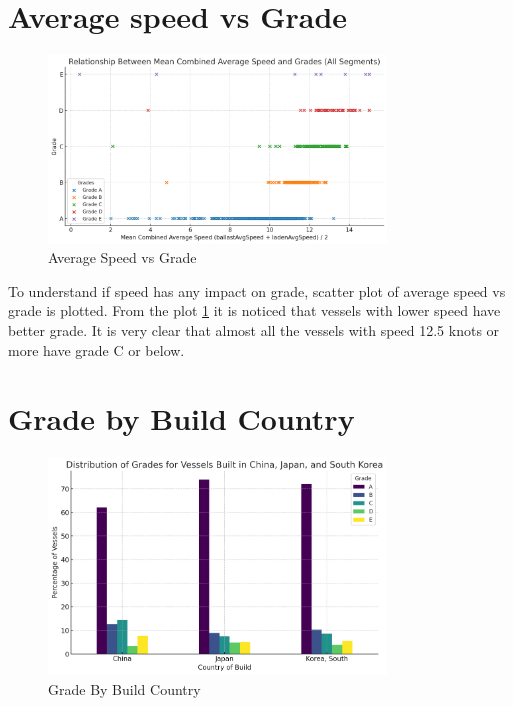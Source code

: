 \section{Average speed vs Grade}
\begin{figure}[h]
    \centering
    \includegraphics[width=0.8\textwidth]{images/grade_speed.png}
    \caption{Average Speed vs Grade}
    \label{grade_speed}
\end{figure}

To understand if speed has any impact on grade, scatter plot of average speed vs grade is plotted.
From the plot \ref{grade_speed} it is noticed that vessels with lower speed have better grade. 
It is very clear that almost all the vessels with speed 12.5 knots or more have grade C or below.

\section{Grade by Build Country}

\begin{figure}[h]
    \centering
    \includegraphics[width=0.8\textwidth]{images/grade_by_build_country.png}
    \caption{Grade By Build Country}
    \label{grade_by_build_country}
\end{figure}

